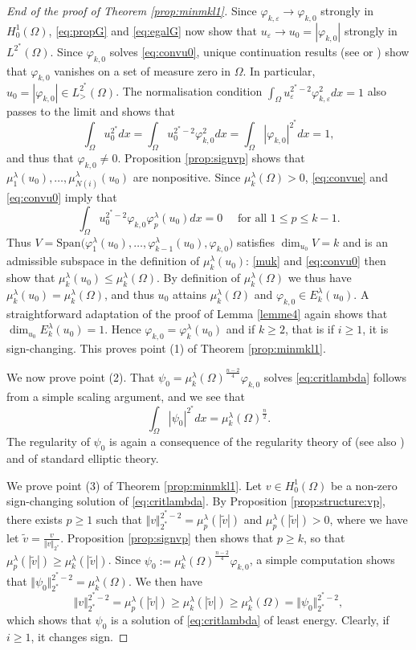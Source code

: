 \documentclass[10pt]{amsart}
\numberwithin{equation}{section}
\newcommand{\ve}{\varepsilon}
\newcommand{\vp}{\varphi}
\newcommand{\Om}{\Omega}
\newcommand{\mkl}{\mu_{k}^{\lambda}}
\newcommand{\mpl}{\mu_{p}^{\lambda}}
\newcommand{\vkl}{\varphi_{k}^{\lambda}}
\theoremstyle{plain}
\theoremstyle{remark}
\begin{document}
 \begin{proof}[End of the proof of Theorem \ref{prop:minmkl1}]
Since $\vp_{k,\ve} \to \vp_{k,0}$ strongly in $H^1_0(\Om)$, \eqref{eq:propG} and \eqref{eq:egalG} now show that $u_\ve \to u_0 = |\vp_{k,0}|$ strongly in $L^{2^*}(\Om)$. Since $\vp_{k,0}$ solves \eqref{eq:convu0}, unique continuation results (see \cite{Aronszajn} or \cite{HardtSimon}) show that $\vp_{k,0}$ vanishes on a set of measure zero in $\Om$. In particular, $u_0 = |\vp_{k,0}| \in L^{2^*}_{>}(\Om)$. The normalisation condition  $\int_{\Om} u_\ve^{2^*-2}\vp_{k,\ve}^2dx = 1$ also passes to the limit and shows that 
 $$ \int_{\Om} u_0^{2^*}dx = \int_{\Om} u_0^{2^*-2} \vp_{k,0}^2dx = \int_{\Om} |\vp_{k,0}|^{2^*}dx = 1, $$
 and thus that $\vp_{k,0} \neq 0$. Proposition \ref{prop:signvp} shows that $\mu_1^{\lambda}(u_0), \dots, \mu_{N(i)}^{\lambda}(u_0)$ are nonpositive.  Since $\mkl(\Omega)>0$, \eqref{eq:convue} and \eqref{eq:convu0} imply that 
$$ \int_{\Om} u_0^{2^*-2} \vp_{k,0} \vp_p^{\lambda}(u_0)dx = 0 \quad \text{ for all } 1 \le p \le k-1. $$
Thus $V =  \text{Span} \big( \vp_1^{\lambda}(u_0), \dots, \vp_{k-1}^\lambda(u_0), \vp_{k,0}\big) $ satisfies $\dim_{u_0} V = k$ and is an admissible subspace in the definition of $\mkl(u_0)$: \eqref{muk} and \eqref{eq:convu0} then show that $\mkl(u_0) \le \mkl(\Om)$. By definition of $\mkl(\Om)$ we thus have $\mkl(u_0) = \mkl(\Om)$, and thus $u_0$ attains $\mkl(\Om)$ and $\vp_{k,0} \in E_k^{\lambda}(u_0)$. A straightforward adaptation of the proof  of Lemma \ref{lemme4} again shows that $\dim_{u_0} E_k^{\lambda}(u_0) = 1$. Hence $\vp_{k,0} = \vkl(u_0)$ and if $k \ge 2$, that is if $i \ge 1$, it is sign-changing. This proves point (1) of Theorem  \ref{prop:minmkl1}. 
 
 \medskip
 We now prove point (2). That $\psi_0 = {\mu_{k}^{\lambda}(\Om)}^{\frac{n-2}{4}} \vp_{k,0}$ solves \eqref{eq:critlambda} follows from a simple scaling argument, and we see that 
 $$ \int_{\Om} |\psi_0|^{2^*}dx = \mkl(\Om)^{\frac{n}{2}}. $$
 The regularity of $\psi_0$ is again a consequence of the regularity theory of \cite{BrezisKato} (see also \cite{Trudinger}) and of standard elliptic theory. 

 \medskip
 
 We prove point (3) of Theorem \ref{prop:minmkl1}. Let $v \in H^1_0(\Om)$ be a non-zero sign-changing solution of \eqref{eq:critlambda}. By Proposition \ref{prop:structure:vp}, there exists $p \ge 1$ such that $\Vert v \Vert_{2^*}^{2^*-2} = \mu_{p}^{\lambda}(|\tilde{v}|)$ and $\mu_{p}^{\lambda}(|\tilde{v}|) >0$, where we have let $\tilde v = \frac{v}{\Vert v \Vert_{2^*}}$. Proposition \ref{prop:signvp} then shows that $p \ge k$, so that $\mpl(|\tilde{v}|) \ge \mkl(|\tilde{v}|)$. Since $\psi_0 := {\mu_{k}^{\lambda}(\Om)}^{\frac{n-2}{4}} \vp_{k,0}$, a simple computation shows that $\Vert \psi_0 \Vert_{2^*}^{2^*-2} = \mkl(\Om)$. We then have 
 $$ \Vert v \Vert_{2^*}^{2^*-2} = \mu_{p}^{\lambda}(|\tilde{v}|) \ge \mkl(|\tilde{v}|) \ge \mkl(\Om) = \Vert \psi_0 \Vert_{2^*}^{2^*-2}, $$
which shows that $\psi_0$ is a solution of \eqref{eq:critlambda} of least energy. Clearly, if $i \ge 1$, it changes sign. 


\end{proof}
\end{document}
